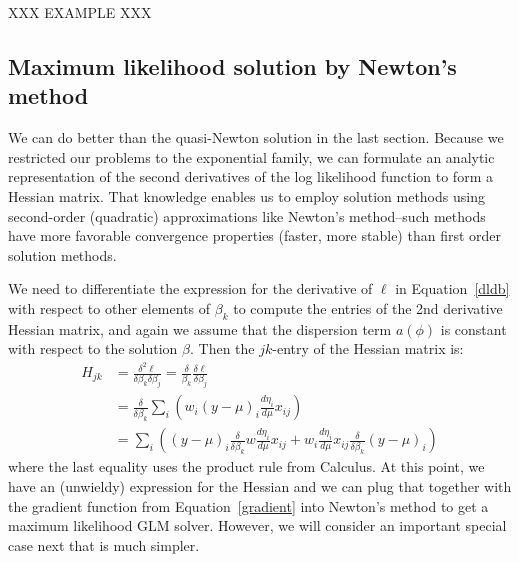 \documentclass[10pt]{article} %
\begin{document}
XXX EXAMPLE XXX



\subsection*{Maximum likelihood solution by Newton's method}

We can do better than the quasi-Newton solution in the last section.  Because
we restricted our problems to the exponential family, we can formulate an
analytic representation of the second derivatives of the log likelihood
function to form a Hessian matrix. That knowledge enables us to employ solution
methods using second-order (quadratic) approximations like Newton's
method--such methods have more favorable convergence properties (faster, more
stable) than first order solution methods.

We need to differentiate the expression for the derivative of $\ell$ in
Equation~\ref{dldb} with respect to other elements
of $\beta_k$ to compute the entries of the 2nd derivative Hessian matrix,
and again we assume that the dispersion term $a(\phi)$ is constant
with respect to the solution $\beta$. Then the $jk$-entry of the
Hessian matrix is:
\begin{align}
H_{jk} &= \frac{\delta^2\ell}{\delta\beta_k\delta\beta_j}
 = \frac{\delta}{\beta_k}\frac{\delta\ell}{\delta\beta_j} \nonumber\\
&=
\frac{\delta}{\delta\beta_k}
\sum_i\left(
w_i(y-\mu)_i\frac{d\eta_i}{d\mu}x_{ij} \right)\nonumber \\
&= \sum_i\left(
(y-\mu)_i
\frac{\delta}{\delta\beta_k}
w\frac{d\eta_i}{d\mu}x_{ij}
+
w_i\frac{d\eta_i}{d\mu}x_{ij}\frac{\delta}{\delta\beta_k}(y-\mu)_i \label{hsum}
\right)
\end{align}
where the last equality uses the product rule from Calculus.
At this point, we have an (unwieldy) expression for the Hessian and
we can plug that together with the gradient function from Equation~\ref{gradient}
into Newton's method to get a maximum likelihood GLM solver.
However, we will consider an important special case next that is much simpler.
\end{document}
